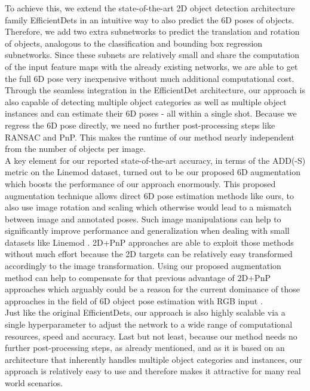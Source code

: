 \documentclass[twocolumn, 10pt, letterpaper]{article}
\begin{document}
To achieve this, we extend the state-of-the-art 2D object detection architecture family EfficientDets in an intuitive way to also predict the 6D poses of objects. Therefore, we add two extra subnetworks to predict the translation and rotation of objects, analogous to the classification and bounding box regression subnetworks. Since these subnets are relatively small and share the computation of the input feature maps with the already existing networks, we are able to get the full 6D pose very inexpensive without much additional computational cost.
Through the seamless integration in the EfficientDet architecture, our approach is also capable of detecting multiple object categories as well as multiple object instances and can estimate their 6D poses - all within a single shot. Because we regress the 6D pose directly, we need no further post-processing steps like RANSAC and PnP. This makes the runtime of our method nearly independent from the number of objects per image.\\
A key element for our reported state-of-the-art accuracy, in terms of the ADD(-S) metric on the Linemod dataset, turned out to be our proposed 6D augmentation which boosts the performance of our approach enormously. This proposed augmentation technique allows direct 6D pose estimation methods like ours, to also use image rotation and scaling which otherwise would lead to a mismatch between image and annotated poses. Such image manipulations can help to significantly improve performance and generalization when dealing with small datasets like Linemod \cite{RandAugment}\cite{AmoebaNet_NAS_FPN}. 2D+PnP approaches are able to exploit those methods without much effort because the 2D targets can be relatively easy transformed accordingly to the image transformation. Using our proposed augmentation method can help to compensate for that previous advantage of 2D+PnP approaches which arguably could be a reason for the current dominance of those approaches in the field of 6D object pose estimation with RGB input \cite{PVNet}\cite{DPOD}\cite{HybridPose}.\\
Just like the original EfficientDets, our approach is also highly scalable via a single hyperparameter  to adjust the network to a wide range of computational resources, speed and accuracy.
Last but not least, because our method needs no further post-processing steps, as already mentioned, and as it is based on an architecture that inherently handles multiple object categories and instances, our approach is relatively easy to use and therefore makes it attractive for many real world scenarios.\\
\end{document}
